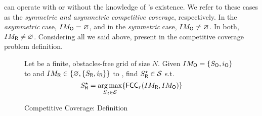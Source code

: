 \opp can operate with or without the knowledge of \rob's existence. We refer to these cases as the {\em symmetric and asymmetric competitive coverage}, respectively.
In the {\em asymmetric} case, $IM_{{\sf O}}=\varnothing$, and in the {\em symmetric} case, $IM_{{\sf O}} \neq \varnothing$. In both, $IM_{{\sf R}} \neq \varnothing $.
Considering all we said above, present in  the competitive coverage problem definition.
\begin{figure}
    \centering
    \begin{mdframed}[backgroundcolor=gray!20] 
\begin{definition}
Let \w be a finite, obstacles-free grid of size $N$. Given $IM_{{\sf O}}=\lbrace S_{{\sf O}} ,i_{{\sf O}} \rbrace$ to \rob and $IM_{{\sf R}} \in \lbrace \varnothing, \lbrace S_{{\sf R}}, i_{{\sf R}} \rbrace \rbrace$ to \opp, find $S_{{\sf R}}^\star \in \mathcal{S}$ s.t.
\begin{dmath*}[compact]
S_\rob^\star =\argmax_{S_\rob\in\mathcal{S}} \lbrace \fcc_{r}(IM_\rob,IM_\opp ) \rbrace
\end{dmath*}
\end{definition}
\end{mdframed}
    \caption{Competitive Coverage: Definition}
    \label{definitions: problem}
\end{figure}
